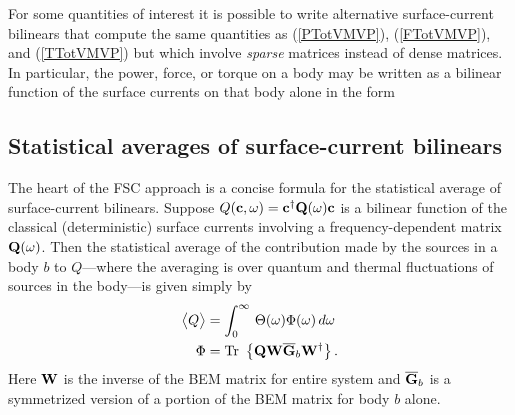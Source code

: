 \documentclass[letterpaper]{article}
\begin{document}
For some quantities of interest it is possible to write alternative
surface-current bilinears that compute the same quantities as 
(\ref{PTotVMVP}), (\ref{FTotVMVP}), and (\ref{TTotVMVP})
but which involve \textit{sparse} matrices instead of dense
matrices. In particular, the power, force, or torque on a body 
may be written as a bilinear function of the surface currents
on that body alone in the form

\subsection*{Statistical averages of surface-current bilinears}

The heart of the FSC approach is a concise formula for the 
statistical average of surface-current bilinears. 
Suppose $Q(\mathbf{c}, \omega)=\mathbf{c}^\dagger \mathbf{Q}(\omega) \mathbf{c}$ is a
bilinear function of the classical (deterministic) surface currents
involving a frequency-dependent matrix $\mathbf{Q}(\omega)$.
Then the statistical average of the contribution made by the sources 
in a body $b$ to $Q$---where the averaging is over quantum and thermal 
fluctuations of sources in the body---is given simply by
\begin{align*}
 \big\langle Q\big\rangle
  &= \int_0^\infty \, \Theta(\omega) \Phi(\omega)\,d\omega 
\\
\Phi
  &= \hbox{Tr }\left\{ \mathbf{Q} \mathbf{W} \overline{\mathbf{G}}_b \mathbf{W}^\dagger\right\}.
\end{align*}
Here $\mathbf{W}$ is the inverse of the BEM matrix for entire system
and $\overline{\mathbf{G}}_b$ is a symmetrized version of a portion of the
BEM matrix for body $b$ alone.

\newpage


\end{document}

